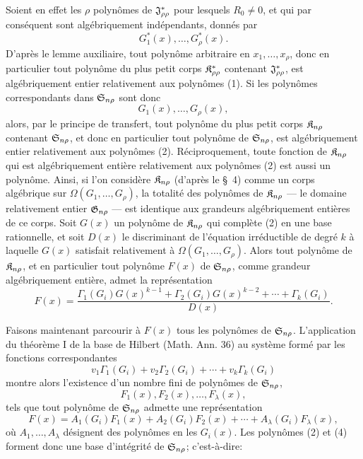 Soient en effet les $\rho$ polynômes de $\mathfrak{J}^*_{\rho\rho}$ pour lesquels $R_0\ne0$, et qui par conséquent sont algébriquement indépendants, donnés par
\begin{equation}
  G_1^*(x),\ldots,G_\rho^*(x).
\tag{1}
\end{equation}
D'après le lemme auxiliaire, tout polynôme arbitraire en $x_1,\ldots,x_\rho$, donc en particulier tout polynôme du plus petit corps $\mathfrak{K}^*_{\rho\rho}$ contenant $\mathfrak{J}^*_{\rho\rho}$, est algébriquement entier relativement aux polynômes (1). Si les polynômes correspondants dans $\mathfrak{S}_{n\rho}$ sont donc
\begin{equation}
  G_1(x),\ldots,G_\rho(x),
\tag{2}
\end{equation}
alors, par le principe de transfert, tout polynôme du plus petit corps $\mathfrak{K}_{n\rho}$ contenant $\mathfrak{S}_{n\rho}$, et donc en particulier tout polynôme de $\mathfrak{S}_{n\rho}$, est algébriquement entier relativement aux polynômes (2). Réciproquement, toute fonction de $\mathfrak{K}_{n\rho}$ qui est algébriquement entière relativement aux polynômes (2) est aussi un polynôme. Ainsi, si l'on considère $\mathfrak{K}_{n\rho}$ (d'après le \S\ 4) comme un corps algébrique sur $\Omega(G_1,\ldots,G_\rho)$, la totalité des polynômes de $\mathfrak{K}_{n\rho}$ --- le domaine relativement entier $\mathfrak{G}_{n\rho}$ --- est identique aux grandeurs algébriquement entières de ce corps. Soit $G(x)$ un polynôme de $\mathfrak{K}_{n\rho}$ qui complète (2) en une base rationnelle, et soit $D(x)$ le discriminant de l'équation irréductible de degré $k$ à laquelle $G(x)$ satisfait relativement à $\Omega(G_1,\ldots,G_\rho)$. Alors tout polynôme de $\mathfrak{K}_{n\rho}$, et en particulier tout polynôme $F(x)$ de $\mathfrak{S}_{n\rho}$, comme grandeur algébriquement entière, admet la représentation
\begin{equation}
  F(x)=\frac{\Gamma_1(G_i)G(x)^{k-1}+\Gamma_2(G_i)G(x)^{k-2}+\cdots+\Gamma_k(G_i)}{D(x)}.
\tag{3}
\end{equation}

Faisons maintenant parcourir à $F(x)$ tous les polynômes de $\mathfrak{S}_{n\rho}$. L'application du théorème I de la base de Hilbert (Math. Ann. 36) au système formé par les fonctions correspondantes
\[
  v_1\Gamma_1(G_i)+v_2\Gamma_2(G_i)+\cdots+v_k\Gamma_k(G_i)
\]
montre alors l'existence d'un nombre fini de polynômes de $\mathfrak{S}_{n\rho}$,
\begin{equation}
  F_1(x),F_2(x),\ldots,F_\lambda(x),
\tag{4}
\end{equation}
tels que tout polynôme de $\mathfrak{S}_{n\rho}$ admette une représentation
\begin{equation}
  F(x)=A_1(G_i)F_1(x)+A_2(G_i)F_2(x)+\cdots+A_\lambda(G_i)F_\lambda(x),
\tag{5}
\end{equation}
où $A_1,\ldots,A_\lambda$ désignent des polynômes en les $G_i(x)$. Les polynômes (2) et (4) forment donc une base d'intégrité de $\mathfrak{S}_{n\rho}$; c'est-à-dire:

